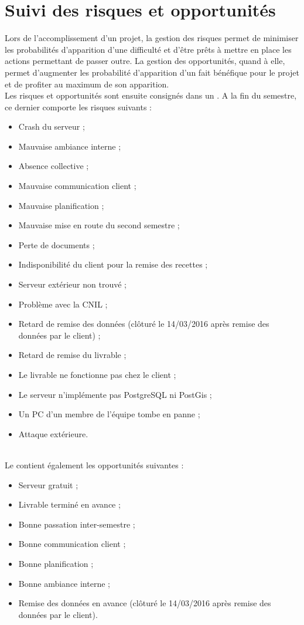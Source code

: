 \documentclass[asi]{picInsa}
\begin{document}
\section{Suivi des risques et opportunités}
Lors de l'accomplissement d'un projet, la gestion des risques permet de minimiser les probabilités d’apparition d'une difficulté et d'être prêts à mettre en place les actions permettant de passer outre. La gestion des opportunités, quand à elle, permet d'augmenter les probabilité d’apparition d'un fait bénéfique pour le projet et de profiter au maximum de son apparition. \\
Les risques et opportunités sont ensuite consignés dans un \PRO{}. A la fin du semestre, ce dernier comporte les risques suivants :
\begin{itemize}
\item Crash du serveur ;
\item Mauvaise ambiance interne ;
\item Absence collective ;
\item Mauvaise communication client ;
\item Mauvaise planification ;
\item Mauvaise mise en route du second semestre ;
\item Perte de documents ;
\item Indisponibilité du client pour la remise des recettes ;
\item Serveur extérieur non trouvé ;
\item Problème avec la CNIL ;
\item Retard de remise des données (clôturé le 14/03/2016 après remise des données par le client) ;
\item Retard de remise du livrable ;
\item Le livrable ne fonctionne pas chez le client ;
\item Le serveur n’implémente pas PostgreSQL ni PostGis ;
\item Un PC d’un membre de l’équipe tombe en panne ;
\item Attaque extérieure.
\end{itemize}
~\\
Le \PRO{} contient également les opportunités suivantes : 
\begin{itemize}
\item Serveur gratuit ;
\item Livrable terminé en avance ;
\item Bonne passation inter-semestre ;
\item Bonne communication client ;
\item Bonne planification ;
\item Bonne ambiance interne ;
\item Remise des données en avance (clôturé le 14/03/2016 après remise des données par le client).
\end{itemize}
\end{document}
